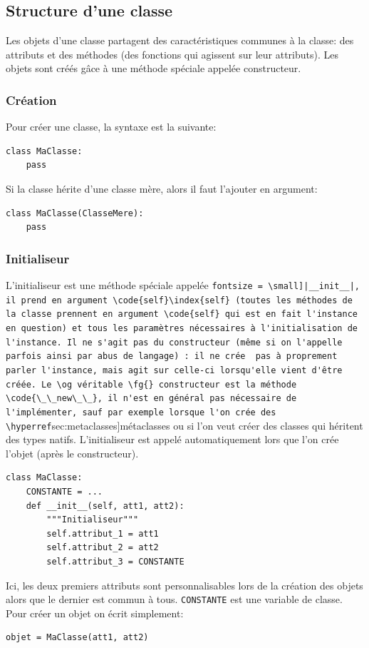 \documentclass[a4paper, 10pt]{article}
\newcommand{\code}[1]{{\small\texttt{#1}}}
\begin{document}
\subsection{Structure d'une classe}
Les objets d'une classe partagent des caractéristiques communes à la classe: des attributs et des méthodes (des fonctions qui agissent sur leur attributs). Les objets sont créés g\^ace à une méthode spéciale appelée constructeur.

\subsubsection{Création}
Pour créer une classe, la syntaxe est la suivante:
\begin{verbatim}
class MaClasse:
    pass
\end{verbatim}

Si la classe hérite d'une classe mère, alors il faut l'ajouter en argument:
\begin{verbatim}
class MaClasse(ClasseMere):
    pass
\end{verbatim}

\subsubsection{Initialiseur}

L'initialiseur est une méthode spéciale appelée \Verb[fontsize = \small]|__init__|, il prend en argument \code{self}\index{self} (toutes les méthodes de la classe prennent en argument \code{self} qui est en fait l'instance en question) et tous les paramètres nécessaires à l'initialisation de l'instance. Il ne s'agit pas du constructeur (même si on l'appelle parfois ainsi par abus de langage) : il ne crée  pas à proprement parler l'instance, mais agit sur celle-ci lorsqu'elle vient d'être créée. Le \og véritable \fg{} constructeur est la méthode \code{\_\_new\_\_}, il n'est en général pas nécessaire de l'implémenter, sauf par exemple lorsque l'on crée des \hyperref[sec:metaclasses]{métaclasses} ou si l'on veut créer des classes qui héritent des types natifs. L'initialiseur est appelé automatiquement lors que l'on crée l'objet (après le constructeur).
\begin{verbatim}
class MaClasse:
    CONSTANTE = ...
    def __init__(self, att1, att2):
        """Initialiseur"""
        self.attribut_1 = att1
        self.attribut_2 = att2
        self.attribut_3 = CONSTANTE
\end{verbatim}
Ici, les deux premiers attributs sont personnalisables lors de la création des objets alors que le dernier est commun à tous. \code{CONSTANTE} est une variable de classe. Pour créer un objet on écrit simplement:
\begin{verbatim}
objet = MaClasse(att1, att2)
\end{verbatim}
\end{document}
